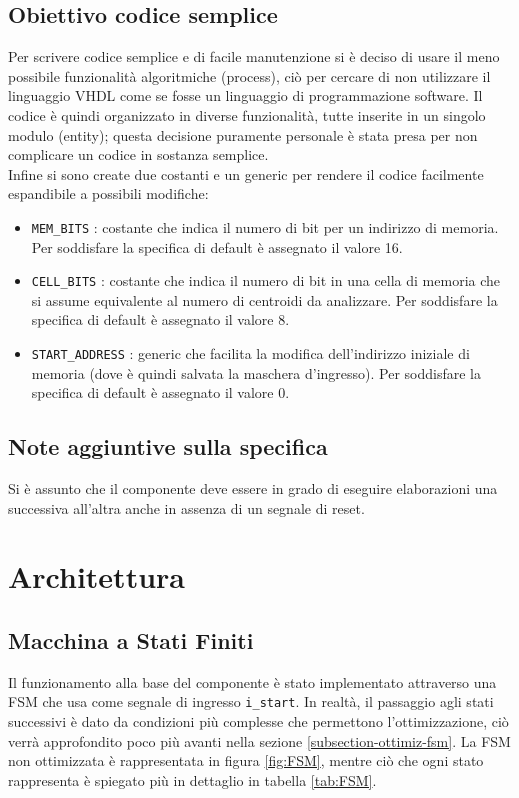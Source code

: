 \documentclass{article}
\begin{document}
\subsection{Obiettivo codice semplice}
Per scrivere codice semplice e di facile manutenzione si è deciso di usare il meno possibile funzionalità algoritmiche (process), ciò per cercare di non utilizzare il linguaggio VHDL come se fosse un linguaggio di programmazione software. Il codice è quindi organizzato in diverse funzionalità, tutte inserite in un singolo modulo (entity); questa decisione puramente personale è stata presa per non complicare un codice in sostanza semplice.\\
Infine si sono create due costanti e un generic per rendere il codice facilmente espandibile a possibili modifiche:
\begin{itemize}
    \item \verb^MEM_BITS^ : costante che indica il numero di bit per un indirizzo di memoria. Per soddisfare la specifica di default è assegnato il valore 16.
    \item \verb^CELL_BITS^ : costante che indica il numero di bit in una cella di memoria che si assume equivalente al numero di centroidi da analizzare. Per soddisfare la specifica di default è assegnato il valore 8.
    \item \verb^START_ADDRESS^ : generic che facilita la modifica dell'indirizzo iniziale di memoria (dove è quindi salvata la maschera d'ingresso). Per soddisfare la specifica di default è assegnato il valore 0.
\end{itemize}

\subsection{Note aggiuntive sulla specifica}
Si è assunto che il componente deve essere in grado di eseguire elaborazioni una successiva all'altra anche in assenza di un segnale di reset.


\pagebreak
\section{Architettura}

\subsection{Macchina a Stati Finiti}
Il funzionamento alla base del componente è stato implementato attraverso una FSM che usa come segnale di ingresso \verb^i_start^. In realtà, il passaggio agli stati successivi è dato da condizioni più complesse che permettono l'ottimizzazione, ciò verrà approfondito poco più avanti nella sezione \ref{subsection-ottimiz-fsm}.
La FSM non ottimizzata è rappresentata in figura \ref{fig:FSM}, mentre ciò che ogni stato rappresenta è spiegato più in dettaglio in tabella \ref{tab:FSM}.
\end{document}
